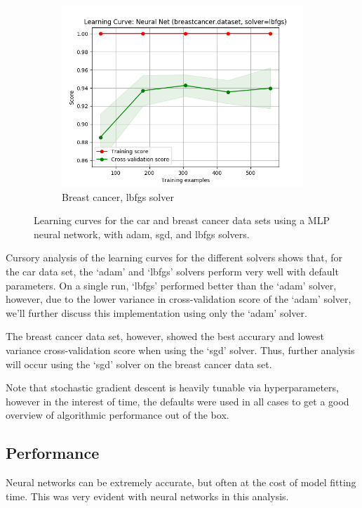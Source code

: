 \documentclass{article}
\begin{document}
\begin{figure}[htb]
\begin{subfigure}{0.33\textwidth}
      \includegraphics[width=\linewidth]{out/neural_net/breastcancer-solver-lbfgs.png}
      \caption{Breast cancer, lbfgs solver}
      \label{fig:nn-param-6}
    \end{subfigure}

    \caption{Learning curves for the car and breast cancer data sets using a MLP neural network, with adam, sgd, and lbfgs solvers.}
    \label{fig:nn-param}
    \end{figure}

    Cursory analysis of the learning curves for the different solvers shows that, for the car data set, the `adam' and `lbfgs' solvers perform very well with default parameters. On a single run, `lbfgs' performed better than the `adam' solver, however, due to the lower variance in cross-validation score of the `adam' solver, we'll further discuss this implementation using only the `adam' solver.

    The breast cancer data set, however, showed the best accurary and lowest variance cross-validation score when using the `sgd' solver. Thus, further analysis will occur using the `sgd' solver on the breast cancer data set.

    Note that stochastic gradient descent is heavily tunable via hyperparameters, however in the interest of time, the defaults were used in all cases to get a good overview of algorithmic performance out of the box.

    \subsection{Performance}
    Neural networks can be extremely accurate, but often at the cost of model fitting time. This was very evident with neural networks in this analysis.
\end{document}
